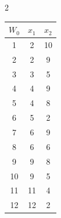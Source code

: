 \begin{multicols}{2}
{\small %


\begin{center}


\vspace*{3pt}


  \tabcolsep=17pt


  \begin{tabular}{|c|c|c|}


 \hline


   $ W_0$ & $x_1$ & $x_2$\\


   \hline


   \hphantom{9}1 & 2 &10\hphantom{9}\\


   \hphantom{9}2 & 2&9\\


   \hphantom{9}3 & 3&5\\


   \hphantom{9}4 & 4& 9\\


   \hphantom{9}5 & 4&8\\


   \hphantom{9}6 & 5&2\\


   \hphantom{9}7 & 6&9\\


   \hphantom{9}8 & 6&6\\


   \hphantom{9}9 & 9&8\\


   10 & 9&5\\


   11 & 11\hphantom{9}& 4\\


   12 &12\hphantom{9}&2 \\


\hline


\end{tabular}


\end{center}


}







\vspace*{6pt}





{ \begin{center}  %



\end{center}}
\end{multicols}
